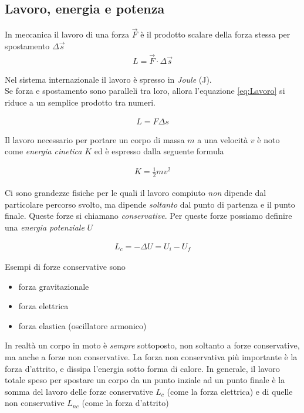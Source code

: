 \documentclass[17pt]{extarticle}
\begin{document}
\subsection{Lavoro, energia e potenza}

In meccanica il lavoro di una forza $\vec{F}$ è il prodotto scalare della forza stessa per spostamento $\Delta \vec{s}$
\begin{eqnarray}\label{eq:Lavoro} 
	L = \vec{F}\cdot\Delta \vec{s}
\end{eqnarray}

Nel sistema internazionale il lavoro è spresso in \emph{Joule} (J).\\
Se forza e spostamento sono paralleli tra loro, allora l'equazione \ref{eq:Lavoro} si riduce a un semplice prodotto tra numeri.

\begin{eqnarray}\label{eq:LavoroS}
	L = F\Delta s
\end{eqnarray}

Il lavoro necessario per portare un corpo di massa $m$ a una velocità $v$ è noto come \emph{energia cinetica} $K$ ed è espresso dalla seguente formula%

\begin{eqnarray}
	K = \frac{1}{2}mv^2
\end{eqnarray}

Ci sono grandezze fisiche per le quali il lavoro compiuto \emph{non} dipende dal particolare percorso svolto, ma dipende \emph{soltanto} dal punto di partenza e il punto finale. Queste forze si chiamano \emph{conservative}. Per queste forze possiamo definire una \emph{energia potenziale} $U$ 

\begin{eqnarray}\label{eq:Potenziale}
	L_c = -\Delta U = U_i -U_f
\end{eqnarray}

Esempi di forze conservative sono
\begin{itemize}
	\item forza gravitazionale
	\item forza elettrica
	\item forza elastica (oscillatore armonico)
\end{itemize}

In realtà un corpo in moto è \emph{sempre} sottoposto, non soltanto a forze conservative, ma anche a forze non conservative. La forza non conservativa più importante è la forza d'attrito, e dissipa l'energia sotto forma di calore. In generale, il lavoro totale speso per spostare un corpo da un punto inziale ad un punto finale è la somma del lavoro delle forze conservative $L_c$ (come la forza elettrica) e di quelle non conservative $L_{nc}$ (come la forza d'attrito)
\end{document}
